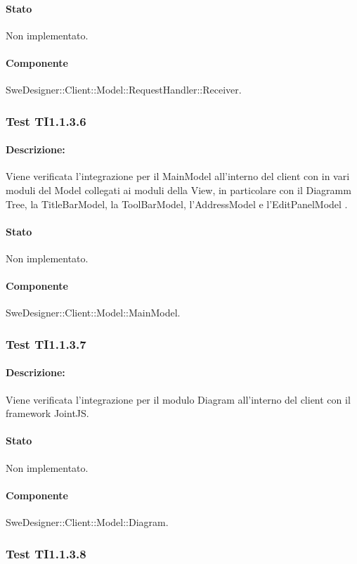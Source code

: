 \documentclass[../PianoDiQualifica.tex]{subfiles}
\begin{document}
	\paragraph{Stato} Non implementato.
	\paragraph{Componente} SweDesigner::Client::Model::RequestHandler::Receiver.
	\subsubsection{Test TI1.1.3.6}
	\paragraph{Descrizione:} Viene verificata l'integrazione per il MainModel all'interno del client con in vari moduli del Model collegati ai moduli della View, in particolare con il Diagramm Tree, la TitleBarModel, la ToolBarModel, l'AddressModel e l'EditPanelModel . 
	\paragraph{Stato} Non implementato.
	\paragraph{Componente} SweDesigner::Client::Model::MainModel.
	\subsubsection{Test TI1.1.3.7}
	\paragraph{Descrizione:} Viene verificata l'integrazione per il modulo Diagram all'interno del client con il framework JointJS. 
	\paragraph{Stato} Non implementato.
	\paragraph{Componente} SweDesigner::Client::Model::Diagram.
	\subsubsection{Test TI1.1.3.8}
\end{document}
